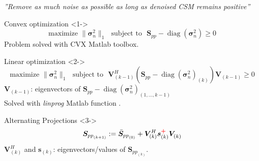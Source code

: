 \documentclass[9pt,xcolor=x11names,compress, notes=show]{beamer}%
\newcommand{\diag}[1]{\operatorname{diag}\left(#1\right)}
\newcommand{\citeTransp}[1]{\color{fg!50} \citep{#1}}
\begin{document}
\begin{frame}{\insertsectionhead}	
\textit{''Remove as much noise as possible as long as denoised CSM remains positive''}
	\begin{block}{Convex optimization   \citeTransp{Hald2017}}<1->
		\begin{equation*}
        			\text{maximize~} \| \bm{\sigma}_{n}^2\|_1 \text{~~subject to~~} \bm{S}_{pp}- \diag{\bm{\sigma}_n^2} \geq 0
		\end{equation*}
		Problem solved with CVX Matlab toolbox.
	\end{block}
	\begin{block}{Linear optimization \citeTransp{dougherty2016}}<2->
		\vspace{-0.2cm}
		\begin{equation*}
			\text{maximize~} \| \bm{\sigma}_{n}^2\|_1   \text{~~subject to~~}  \bm{V}^{H}_{(k-1)} \left( \bm{S}_{pp}- \diag{\bm{\sigma}_n^2}_{(k)} \right) \bm{V}_{(k-1)} \geq 0 
		\end{equation*}
		 $\bm{V}_{(k-1)}$: eigenvectors of $\bm{S}_{pp}-\diag{\bm{\sigma}_n^2}_{(1,...,k-1)} $\\[1pt]
		Solved with \textit{linprog} Matlab function .
	\end{block}
	\begin{block}{Alternating Projections  \citeTransp{leclere:hal-01279944}}<3->
		\begin{equation*}
        			 \bm{S}_{{pp}_{(k+1)}} := \bar{\bm{S}}_{{pp}_{(0)}} + \bm{V}^{H}_{(k)} \bm{s}_{(k)}^{\textcolor{red}{\textbf{+}}}\bm{V}^{~}_{(k)}
		\end{equation*}
		$\bm{V}^{H}_{(k)}$ and $\bm{s}_{(k)}$: eigenvectors/values of  $\bm{S}_{{pp}_{(k)}}$.\\[1pt]
	\end{block}	
\end{frame}

\end{document}
